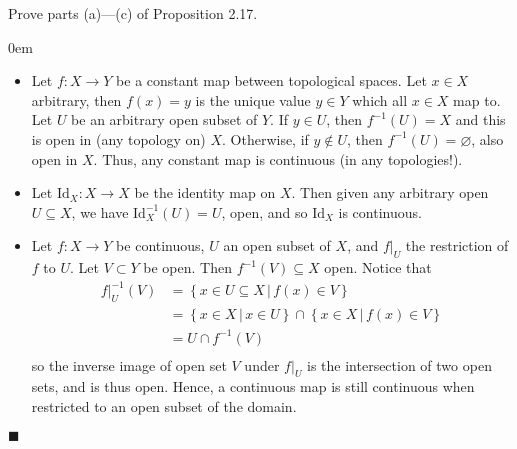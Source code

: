 \documentclass[12pt]{article}
\renewcommand{\qed}{\hfill$\blacksquare$}
\renewenvironment{proof}{\begin{addmargin}[1em]{0em}\begin{newproof}}{\end{newproof}\end{addmargin}\qed}
\newenvironment{exercise}[2][Exercise]{\begin{trivlist}
\item[\hskip \labelsep {\bfseries #1}\hskip \labelsep {\bfseries #2.}]}{\end{trivlist}}
\begin{document}
\begin{exercise}{2.18}
Prove parts (a)---(c) of Proposition 2.17.
\end{exercise}
\begin{proof}

\begin{itemize}
	\item Let $f:X\rightarrow Y$ be a constant map between topological spaces. Let $x\in X$ arbitrary, then $f\left(x\right)=y$ is the unique value $y\in Y$ which all $x\in X$ map to. Let $U$ be an arbitrary open subset of $Y$. If $y\in U$, then $f^{-1}\left(U\right) = X$ and this is open in (any topology on) $X$. Otherwise, if $y \notin U$, then $f^{-1}\left(U\right) = \varnothing$, also open in $X$. Thus, any constant map is continuous (in any topologies!).

	\item Let $\text{Id}_X:X\rightarrow X$ be the identity map on $X$. Then given any arbitrary open $U\subseteq X$, we have $\text{Id}_X^{-1}\left(U\right) = U$, open, and so $\text{Id}_X$ is continuous.

	\item Let $f:X\rightarrow Y$ be continuous, $U$ an open subset of $X$, and $f|_U$ the restriction of $f$ to $U$. Let $V \subset Y$ be open. Then $f^{-1}\left(V\right) \subseteq X$ open. Notice that
	\begin{equation*}\begin{split}
	f|_U^{-1}\left(V\right) & = \left\{x\in U\subseteq X \, | \, f\left(x\right) \in V\right\} \\
	& = \left\{x\in X \, | \, x\in U\right\}\cap \left\{x\in X \, | \, f\left(x\right)\in V\right\} \\
	& = U \cap f^{-1}\left(V\right) \\
	\end{split}\end{equation*}
so the inverse image of open set $V$ under $f|_U$ is the intersection of two open sets, and is thus open. Hence, a continuous map is still continuous when restricted to an open subset of the domain.
\end{itemize}
\end{proof}
\end{document}
